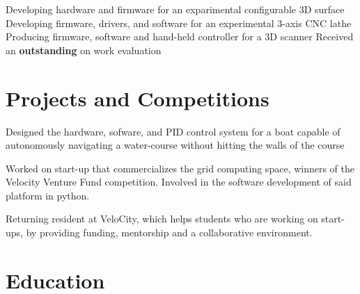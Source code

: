 \documentclass[11pt,a4paper]{moderncv}
\begin{document}
{Developing hardware and firmware for an exparimental configurable 3D surface
    \newline{}Developing firmware, drivers, and software for an experimental 3-axis CNC lathe
    \newline{}Producing firmware, software and hand-held controller for a 3D scanner
\newline{}Received an \textbf{outstanding} on work evaluation}

\section{Projects and Competitions}

{Designed the hardware, sofware, and PID control system for a boat capable of autonomously navigating a water-course without hitting the walls of the course}

{Worked on start-up that commercializes the grid computing space, winners of the Velocity Venture Fund competition.
\newline{}Involved in the software development of said platform in python.}

{Returning resident at VeloCity, which helps students who are working on start-ups, by providing funding, mentorship and a collaborative environment.}

\section{Education}
\end{document}
